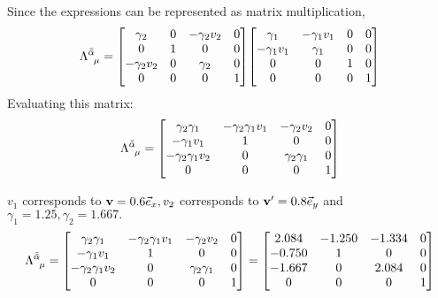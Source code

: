 \documentclass{report}
\begin{document}
\begin{subquests}
\begin{subquests}
		\item		
		Since the expressions can be represented as matrix multiplication,	
		\begin{gather*}
			\Lambda^{\bar{\bar{\alpha}}}_{\;\;\mu} = 	
			\mqty[
				\gamma_{2} & 0 & -\gamma_{2} v_{2} & 0 \\
				 0 & 1 & 0 & 0 \\
				-\gamma_{2} v_{2} & 0 & \gamma_{2} & 0 \\
				0 & 0 & 0 & 1
			]
			\mqty[
				\gamma_{1} & -\gamma_{1} v_{1} & 0 & 0 \\
				-\gamma_{1} v_{1} & \gamma_{1} & 0 & 0 \\
				0 & 0 & 1 & 0 \\
				0 & 0 & 0 & 1
			]
		\end{gather*}
		Evaluating this matrix:
		\begin{gather*}
			\Lambda^{\bar{\bar{\alpha}}}_{\;\;\mu} = 	
			\mqty[
				\gamma_{2}\gamma_{1} & -\gamma_{2}\gamma_{1}v_{1} & -\gamma_{2}v_{2} & 0 \\
				-\gamma_{1}v_{1} & 1 & 0 & 0 \\
				-\gamma_{2}\gamma_{1} v_{2} & 0 & \gamma_{2}\gamma_{1} & 0 \\
				0 & 0 & 0 & 1
			]
		\end{gather*}

		\item 
		$v_{1}$ corresponds to ${\vb v} = 0.6{\vec e_{x}}, v_{2}$ corresponds to ${\vb v'} = 0.8{\vec e_{y}}$ and $\gamma_{1} = 1.25, \gamma_{2} = 1.667.$
		\begin{gather*}
			\Lambda^{\bar{\bar{\alpha}}}_{\;\;\mu} = 	
			\mqty[
				\gamma_{2}\gamma_{1} & -\gamma_{2}\gamma_{1}v_{1} & -\gamma_{2}v_{2} & 0 \\
				-\gamma_{1}v_{1} & 1 & 0 & 0 \\
				-\gamma_{2}\gamma_{1} v_{2} & 0 & \gamma_{2}\gamma_{1} & 0 \\
				0 & 0 & 0 & 1
			]
			=
			\mqty[
				2.084 & -1.250 & -1.334 & 0 \\
				-0.750 & 1 & 0 & 0 \\
				-1.667 & 0 & 2.084 & 0 \\
				0 & 0 & 0 & 1
			]
		\end{gather*}

		\item %
		

\end{subquests}
\end{subquests}
\end{document}
